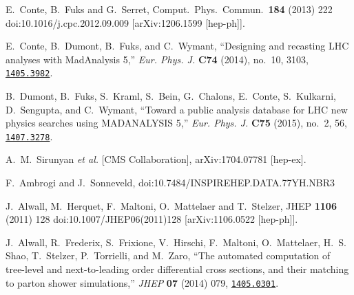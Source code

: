 \documentclass[12pt,A4paper
english, %
singlespacing, %
parskip, %
headsepline, %
]{article}
\begin{document}
%
\begin{thebibliography}{9}


  
  E.~Conte, B.~Fuks and G.~Serret,
  Comput.\ Phys.\ Commun.\  {\bf 184} (2013) 222
  doi:10.1016/j.cpc.2012.09.009
  [arXiv:1206.1599 [hep-ph]].
  
E.~Conte, B.~Dumont, B.~Fuks, and C.~Wymant, ``{Designing and recasting LHC
  analyses with MadAnalysis 5},'' {\em Eur. Phys. J.} {\bf C74} (2014), no.~10,
  3103,
\href{http://www.arXiv.org/abs/1405.3982}{{\tt 1405.3982}}.

B.~Dumont, B.~Fuks, S.~Kraml, S.~Bein, G.~Chalons, E.~Conte, S.~Kulkarni,
  D.~Sengupta, and C.~Wymant, ``{Toward a public analysis database for LHC new
  physics searches using MADANALYSIS 5},'' {\em Eur. Phys. J.} {\bf C75}
  (2015), no.~2, 56,
\href{http://www.arXiv.org/abs/1407.3278}{{\tt 1407.3278}}.

  A.~M.~Sirunyan {\it et al.} [CMS Collaboration],
  arXiv:1704.07781 [hep-ex].
  
  
  F.~Ambrogi and J.~Sonneveld,
  doi:10.7484/INSPIREHEP.DATA.77YH.NBR3
  
  
  J.~Alwall, M.~Herquet, F.~Maltoni, O.~Mattelaer and T.~Stelzer,
  JHEP {\bf 1106} (2011) 128
  doi:10.1007/JHEP06(2011)128
  [arXiv:1106.0522 [hep-ph]].
  
J.~Alwall, R.~Frederix, S.~Frixione, V.~Hirschi, F.~Maltoni, O.~Mattelaer,
  H.~S. Shao, T.~Stelzer, P.~Torrielli, and M.~Zaro, ``{The automated
  computation of tree-level and next-to-leading order differential cross
  sections, and their matching to parton shower simulations},'' {\em JHEP} {\bf
  07} (2014) 079,
\href{http://www.arXiv.org/abs/1405.0301}{{\tt 1405.0301}}.


\end{thebibliography}
\end{document}

